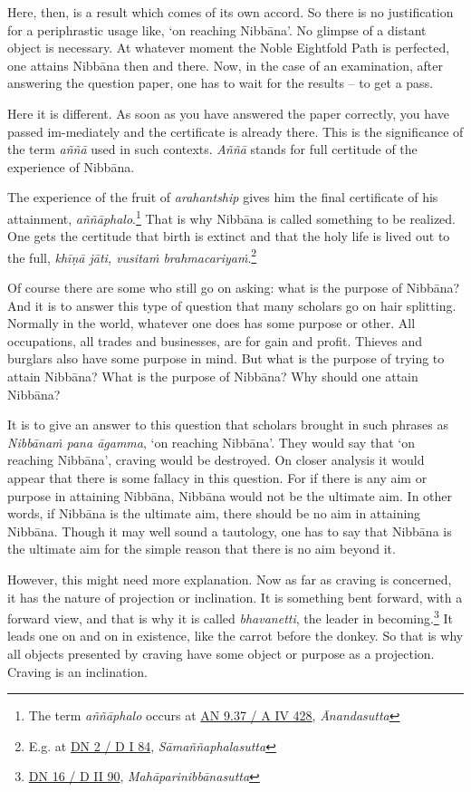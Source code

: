 Here, then, is a result which comes of its own accord. So there is no justification for a periphrastic usage like, `on reaching Nibbāna'. No glimpse of a distant object is necessary. At whatever moment the Noble Eightfold Path is perfected, one attains Nibbāna then and there. Now, in the case of an examination, after answering the question paper, one has to wait for the results -- to get a pass.

Here it is different. As soon as you have answered the paper correctly, you have passed im-mediately and the certificate is already there. This is the significance of the term \emph{aññā} used in such contexts. \emph{Aññā} stands for full certitude of the experience of Nibbāna.

The experience of the fruit of \emph{arahantship} gives him the final certificate of his attainment, \emph{aññāphalo}.\footnote{The term \emph{aññāphalo} occurs at \href{https://suttacentral.net/an9.37/pli/ms}{AN 9.37 / A IV 428}, \emph{Ānandasutta}} That is why Nibbāna is called something to be realized. One gets the certitude that birth is extinct and that the holy life is lived out to the full, \emph{khīṇā jāti, vusitaṁ brahmacariyaṁ}.\footnote{E.g. at \href{https://suttacentral.net/dn2/pli/ms}{DN 2 / D I 84}, \emph{Sāmaññaphalasutta}}

Of course there are some who still go on asking: what is the purpose of Nibbāna? And it is to answer this type of question that many scholars go on hair splitting. Normally in the world, whatever one does has some purpose or other. All occupations, all trades and businesses, are for gain and profit. Thieves and burglars also have some purpose in mind. But what is the purpose of trying to attain Nibbāna? What is the purpose of Nibbāna? Why should one attain Nibbāna?

It is to give an answer to this question that scholars brought in such phrases as \emph{Nibbānaṁ pana āgamma}, `on reaching Nibbāna'. They would say that `on reaching Nibbāna', craving would be destroyed. On closer analysis it would appear that there is some fallacy in this question. For if there is any aim or purpose in attaining Nibbāna, Nibbāna would not be the ultimate aim. In other words, if Nibbāna is the ultimate aim, there should be no aim in attaining Nibbāna. Though it may well sound a tautology, one has to say that Nibbāna is the ultimate aim for the simple reason that there is no aim beyond it.

However, this might need more explanation. Now as far as craving is concerned, it has the nature of projection or inclination. It is something bent forward, with a forward view, and that is why it is called \emph{bhavanetti}, the leader in becoming.\footnote{\href{https://suttacentral.net/dn16/pli/ms}{DN 16 / D II 90}, \emph{Mahāparinibbānasutta}} It leads one on and on in existence, like the carrot before the donkey. So that is why all objects presented by craving have some object or purpose as a projection. Craving is an inclination.

